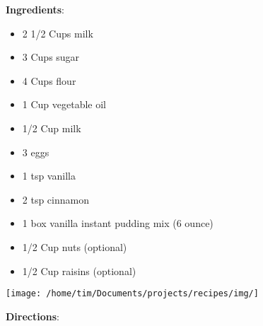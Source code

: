 \documentclass[11pt, twoside, openany]{book}
\begin{document}
\begin{minipage}[t]{0.8\linewidth}
\textbf{Ingredients}:\vspace{-3mm}
\begin{multicols}{2}
\begin{itemize}\setlength\itemsep{-1mm}
\item 2 1/2 Cups milk
\item 3 Cups sugar
\item 4 Cups flour
\item 1 Cup vegetable oil
\item 1/2 Cup milk
\item 3 eggs
\item 1 tsp vanilla
\item 2 tsp cinnamon
\item 1 box vanilla instant pudding mix (6 ounce)
\item 1/2 Cup nuts (optional)
\item 1/2 Cup raisins (optional)
\end{itemize}
\end{multicols}
\end{minipage}
\begin{minipage}[t]{0.2\linewidth}
\centering \strut\vspace*{-\baselineskip}\newline
\texttt{[image: /home/tim/Documents/projects/recipes/img/]}\\
\end{minipage}\vspace{3mm}
\textbf{Directions}:
\end{document}
